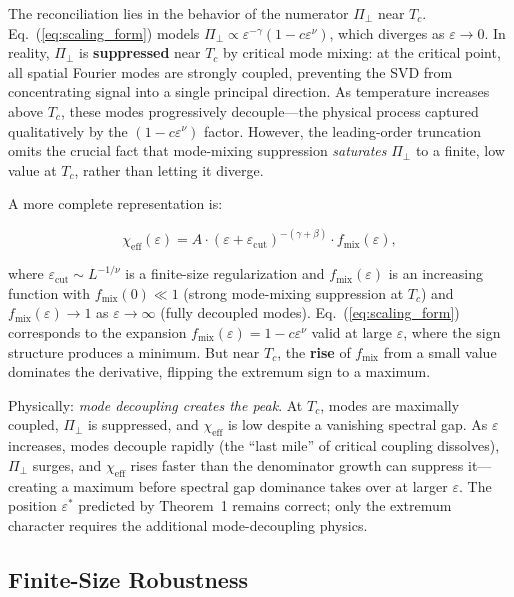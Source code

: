 \documentclass[aps,prl,twocolumn,superscriptaddress,byrevtex]{article}
\begin{document}
The reconciliation lies in the behavior of the numerator $\Pi_\perp$ near $T_c$. Eq.~(\ref{eq:scaling_form}) models $\Pi_\perp \propto \varepsilon^{-\gamma}(1 - c\varepsilon^\nu)$, which diverges as $\varepsilon \to 0$. In reality, $\Pi_\perp$ is \textbf{suppressed} near $T_c$ by critical mode mixing: at the critical point, all spatial Fourier modes are strongly coupled, preventing the SVD from concentrating signal into a single principal direction. As temperature increases above $T_c$, these modes progressively decouple---the physical process captured qualitatively by the $(1 - c\varepsilon^\nu)$ factor. However, the leading-order truncation omits the crucial fact that mode-mixing suppression \emph{saturates} $\Pi_\perp$ to a finite, low value at $T_c$, rather than letting it diverge.

A more complete representation is:

\begin{equation}
\chi_{\text{eff}}(\varepsilon) = A \cdot (\varepsilon + \varepsilon_{\text{cut}})^{-(\gamma+\beta)} \cdot f_{\text{mix}}(\varepsilon),
\label{eq:full_form}
\end{equation}

where $\varepsilon_{\text{cut}} \sim L^{-1/\nu}$ is a finite-size regularization and $f_{\text{mix}}(\varepsilon)$ is an increasing function with $f_{\text{mix}}(0) \ll 1$ (strong mode-mixing suppression at $T_c$) and $f_{\text{mix}}(\varepsilon) \to 1$ as $\varepsilon \to \infty$ (fully decoupled modes). Eq.~(\ref{eq:scaling_form}) corresponds to the expansion $f_{\text{mix}}(\varepsilon) = 1 - c\varepsilon^\nu$ valid at large $\varepsilon$, where the sign structure produces a minimum. But near $T_c$, the \textbf{rise} of $f_{\text{mix}}$ from a small value dominates the derivative, flipping the extremum sign to a maximum.

Physically: \emph{mode decoupling creates the peak}. At $T_c$, modes are maximally coupled, $\Pi_\perp$ is suppressed, and $\chi_{\text{eff}}$ is low despite a vanishing spectral gap. As $\varepsilon$ increases, modes decouple rapidly (the ``last mile'' of critical coupling dissolves), $\Pi_\perp$ surges, and $\chi_{\text{eff}}$ rises faster than the denominator growth can suppress it---creating a maximum before spectral gap dominance takes over at larger $\varepsilon$. The position $\varepsilon^*$ predicted by Theorem~1 remains correct; only the extremum character requires the additional mode-decoupling physics.

\subsection{Finite-Size Robustness}
\end{document}
